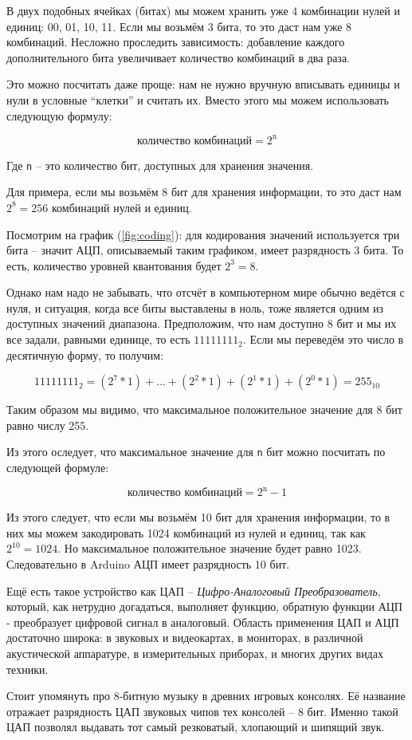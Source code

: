 \documentclass[../sparc.tex]{subfiles}
\begin{document}
В двух подобных ячейках (битах) мы можем хранить уже 4 комбинации нулей и
единиц: 00, 01, 10, 11.  Если мы возьмём 3 бита, то это даст нам уже 8
комбинаций.  Несложно проследить зависимость: добавление каждого дополнительного
бита увеличивает количество комбинаций в два раза.

Это можно посчитать даже проще: нам не нужно вручную вписывать единицы и нули в
условные ``клетки'' и считать их.  Вместо этого мы можем использовать следующую
формулу:

\begin{equation}
  \mbox{количество комбинаций} = 2^{\mbox{n}}
\end{equation}

Где \texttt{n} -- это количество бит, доступных для хранения значения.

Для примера, если мы возьмём 8 бит для хранения информации, то это даст нам $2^8
= 256$ комбинаций нулей и единиц.

Посмотрим на график (\ref{fig:coding}): для кодирования значений используется
три бита -- значит АЦП, описываемый таким графиком, имеет разрядность 3 бита.  То
есть, количество уровней квантования будет $2^3 = 8$.

Однако нам надо не забывать, что отсчёт в компьютерном мире обычно ведётся с
нуля, и ситуация, когда все биты выставлены в ноль, тоже является одним из
доступных значений диапазона.  Предположим, что нам доступно 8 бит и мы их все
задали, равными единице, то есть $11111111_2$.  Если мы переведём это число в
десятичную форму, то получим:

\begin{equation}
  11111111_2 = (2^7 * 1) + \mbox{...} + (2^2 * 1) + (2^1 * 1) + (2^0 * 1) = 255_{10}
\end{equation}

Таким образом мы видимо, что максимальное положительное значение для 8 бит равно
числу 255.

Из этого оследует, что максимальное значение для \texttt{n} бит можно посчитать
по следующей формуле:

\begin{equation}
  \mbox{количество комбинаций} = 2^{\mbox{n}} - 1
\end{equation}

Из этого следует, что если мы возьмём 10 бит для хранения информации, то в них
мы можем закодировать 1024 комбинаций из нулей и единиц, так как $2^{10} =
1024$.  Но максимальное положительное значение будет равно 1023.  Следовательно
в Arduino АЦП имеет разрядность 10 бит.

Ещё есть такое устройство как ЦАП -- \emph{Цифро-Аналоговый Преобразователь},
который, как нетрудно догадаться, выполняет функцию, обратную функции АЦП -
преобразует цифровой сигнал в аналоговый. Область применения ЦАП и АЦП
достаточно широка: в звуковых и видеокартах, в мониторах, в различной
акустической аппаратуре, в измерительных приборах, и многих других видах
техники.

Стоит упомянуть про 8-битную музыку в древних игровых консолях. Её название
отражает разрядность ЦАП звуковых чипов тех консолей -- 8 бит. Именно такой ЦАП
позволял выдавать тот самый резковатый, хлопающий и шипящий звук.
\end{document}
